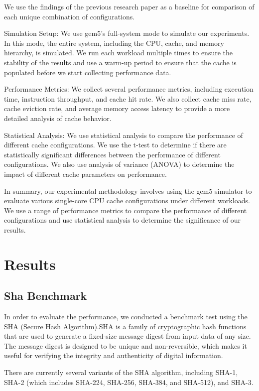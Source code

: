 \documentclass[conference]{IEEEtran}
\begin{document}
We use the findings of the previous research paper as a baseline for comparison of each unique combination of configurations.

Simulation Setup:
We use gem5's full-system mode to simulate our experiments. In this mode, the entire system, including the CPU, cache, and memory hierarchy, is simulated. We run each workload multiple times to ensure the stability of the results and use a warm-up period to ensure that the cache is populated before we start collecting performance data.

Performance Metrics:
We collect several performance metrics, including execution time, instruction throughput, and cache hit rate. We also collect cache miss rate, cache eviction rate, and average memory access latency to provide a more detailed analysis of cache behavior.

Statistical Analysis:
We use statistical analysis to compare the performance of different cache configurations. We use the t-test to determine if there are statistically significant differences between the performance of different configurations. We also use analysis of variance (ANOVA) to determine the impact of different cache parameters on performance.

In summary, our experimental methodology involves using the gem5 simulator to evaluate various single-core CPU cache configurations under different workloads. We use a range of performance metrics to compare the performance of different configurations and use statistical analysis to determine the significance of our results.

\section{Results}


\subsection{Sha Benchmark}
In order to evaluate the performance, we conducted a benchmark test using the SHA (Secure Hash Algorithm).SHA is a family of cryptographic hash functions that are used to generate a fixed-size message digest from input data of any size. The message digest is designed to be unique and non-reversible, which makes it useful for verifying the integrity and authenticity of digital information.

There are currently several variants of the SHA algorithm, including SHA-1, SHA-2 (which includes SHA-224, SHA-256, SHA-384, and SHA-512), and SHA-3.
\end{document}
